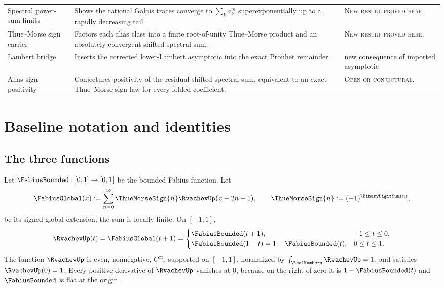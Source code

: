 \documentclass[11pt,oneside]{article}
\theoremstyle{definition}
\theoremstyle{remark}
\newcommand{\newresult}{\textcolor{newgreen}{\textsc{New result proved here.}}}
\newcommand{\openstatus}{\textcolor{conjectureorange}{\textsc{Open or conjectural.}}}
\begin{document}
{\begin{longtable}{@{}>{\raggedright\arraybackslash}p{}>{\raggedright\arraybackslash}p{}>{\raggedright\arraybackslash}p{}@{}}
Spectral power-sum limits & Shows the rational Galois traces converge to $\sum_k a_k^m$ superexponentially up to a rapidly decreasing tail. & \newresult \\
Thue--Morse sign carrier & Factors each alias class into a finite root-of-unity Thue--Morse product and an absolutely convergent shifted spectral sum. & \newresult \\
Lambert bridge & Inserts the corrected lower-Lambert asymptotic into the exact Prouhet remainder. & new consequence of imported asymptotic \\
Alias-sign positivity & Conjectures positivity of the residual shifted spectral sum, equivalent to an exact Thue--Morse sign law for every folded coefficient. & \openstatus \\
\end{longtable}
}

\section{Baseline notation and identities}\label{p1:sec:baseline}

\subsection{The three functions}

Let $\FabiusBounded:[0,1]\to[0,1]$ be the bounded Fabius function.  Let
\begin{equation}\label{p1:eq:global-F}
 \FabiusGlobal(x):=\sum_{n=0}^{\infty}\ThueMorseSign{n}\RvachevUp(x-2n-1),
 \qquad \ThueMorseSign{n}:=(-1)^{\BinaryDigitSum(n)},
\end{equation}
be its signed global extension; the sum is locally finite.  On $[-1,1]$,
\begin{equation}\label{p1:eq:Up-F-relations}
 \RvachevUp(t)=\FabiusGlobal(t+1)=
 \begin{cases}
  \FabiusBounded(t+1),&-1\le t\le0,\\
  \FabiusBounded(1-t)=1-\FabiusBounded(t),&0\le t\le1.
 \end{cases}
\end{equation}
The function $\RvachevUp$ is even, nonnegative, $C^\infty$, supported on $[-1,1]$,
normalized by $\int_{\RealNumbers}\RvachevUp=1$, and satisfies $\RvachevUp(0)=1$.
Every positive derivative of $\RvachevUp$ vanishes at $0$, because on the right of
zero it is $1-\FabiusBounded(t)$ and $\FabiusBounded$ is flat at the origin.
\end{document}
